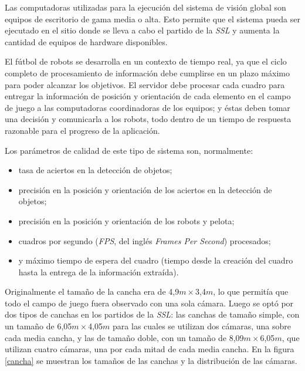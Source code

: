 Las computadoras utilizadas para la ejecución del sistema de visión global son
equipos de escritorio de gama media o alta. Esto permite que el sistema pueda
ser ejecutado en el sitio donde se lleva a cabo el partido de la \emph{SSL} y
aumenta la cantidad de equipos de hardware disponibles.

El fútbol de robots se desarrolla en un contexto de tiempo real, ya que el
ciclo completo de procesamiento de información debe cumplirse en un plazo
máximo para poder alcanzar los objetivos. El servidor debe procesar cada
cuadro para entregar la información de posición y orientación de cada elemento
en el campo de juego a las computadoras coordinadoras de los equipos; y éstas
deben tomar una decisión y comunicarla a los robots, todo dentro de un tiempo
de respuesta razonable para el progreso de la aplicación.

Los parámetros de calidad de este tipo de sistema son, normalmente:

\begin{itemize}

	\item 	tasa de aciertos en la detección de objetos;

	\item 	precisión en la posición y orientación de los aciertos en la
		detección de objetos;

	\item 	precisión en la posición y orientación de los robots y pelota;

	\item 	cuadros por segundo (\emph{FPS}, del inglés \emph{Frames Per
		Second}) procesados;

	\item 	y máximo tiempo de espera del cuadro (tiempo desde la creación
		del cuadro hasta la entrega de la información extraída).

\end{itemize}

Originalmente el tamaño de la cancha era de 4,9$m\times$3,4$m$, lo que permitía
que todo el campo de juego fuera observado con una sola cámara. Luego se optó
por dos tipos de canchas en los partidos de la \emph{SSL}: las canchas de tamaño
simple, con un tamaño de 6,05$m\times$4,05$m$ para las cuales se utilizan dos
cámaras, una sobre cada media cancha, y las de tamaño doble, con un tamaño de
8,09$m\times$6,05$m$, que utilizan cuatro cámaras, una por cada mitad de cada
media cancha. En la figura \ref{cancha} se muestran los tamaños de las canchas y
la distribución de las cámaras.

